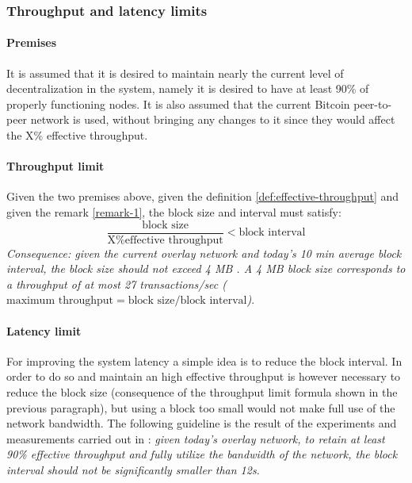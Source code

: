 \subsubsection{Throughput and latency limits}

\paragraph{Premises} It is assumed that it is desired to maintain nearly the
current level of decentralization in the system, namely it is desired to have at
least 90\% of properly functioning nodes. It is also assumed that the current
Bitcoin peer-to-peer network is used, without bringing any changes to it since
they would affect the X\% effective throughput.

\paragraph{Throughput limit} Given the two premises above, given the definition
\ref{def:effective-throughput} and given the remark \ref{remark-1}, the block size and
interval must satisfy:
\[ \frac{\text{block size}}{\text{X\% effective throughput}} < \text{block interval} \]
\emph{Consequence: given the current overlay network and today’s 10 min average
block interval, the block size should not exceed 4 MB \cite{croman-scaling-blockchain}.
A 4 MB block size corresponds to a throughput of at most 27 transactions/sec
($\text{maximum throughput} = \text{block size} / \text{block interval}$)}.


\paragraph{Latency limit} For improving the system latency a simple idea is to
reduce the block interval. In order to do so and maintain an high effective
throughput is however necessary to reduce the block size (consequence of the
throughput limit formula shown in the previous paragraph), but using a block too
small would not make full use of the network bandwidth. The following guideline
is the result of the experiments and measurements carried out in
\cite{croman-scaling-blockchain}:  \emph{given today’s overlay network, to retain at
least 90\% effective throughput and fully utilize the bandwidth of the network,
the block interval should not be significantly smaller than 12s.}





